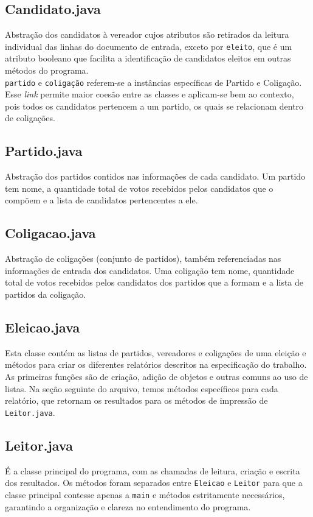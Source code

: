 \documentclass[12pt,a4paper]{article}
\begin{document}
\subsection{Candidato.java}
Abstração dos candidatos à vereador cujos atributos são retirados da leitura individual das linhas do documento de entrada, exceto por \texttt{eleito}, que é um atributo booleano que facilita a identificação de candidatos eleitos em outras métodos do programa.\\
\texttt{partido} e \texttt{coligação} referem-se a instâncias específicas de Partido e Coligação. Esse \textit{link} permite maior coesão entre as classes e aplicam-se bem ao contexto, pois todos os candidatos pertencem a um partido, os quais se relacionam dentro de coligações.\\

\subsection{Partido.java}
Abstração dos partidos contidos nas informações de cada candidato. Um partido tem nome, a quantidade total de votos recebidos pelos candidatos que o compõem e a lista de candidatos pertencentes a ele.\\

\subsection{Coligacao.java}
Abstração de coligações (conjunto de partidos), também referenciadas nas informações de entrada dos candidatos. Uma coligação tem nome, quantidade total de votos recebidos pelos candidatos dos partidos que a formam e a lista de partidos da coligação.\\

\subsection{Eleicao.java}
Esta classe contém as listas de partidos, vereadores e coligações de uma eleição e métodos para criar os diferentes relatórios descritos na especificação do trabalho.\\
As primeiras funções são de criação, adição de objetos e outras comuns ao uso de listas. Na seção seguinte do arquivo, temos métodos específicos para cada relatório, que retornam os resultados para os métodos de impressão de \texttt{Leitor.java}.

\subsection{Leitor.java}
É a classe principal do programa, com as chamadas de leitura, criação e escrita dos resultados. Os métodos foram separados entre \texttt{Eleicao} e \texttt{Leitor} para que a classe principal contesse apenas a \texttt{main} e métodos estritamente necessários, garantindo a organização e clareza no entendimento do programa.
\end{document}
